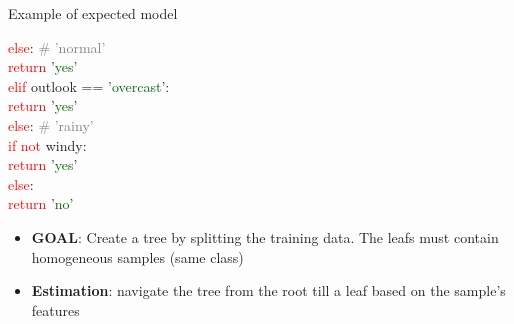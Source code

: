 \documentclass[xcolor=table]{beamer}
\begin{document}
\begin{frame}
\begin{exampleblock}{Example of expected model}
\begin{minipage}{0.25\textwidth}
			\hspace*{10pt}\textcolor{red}{else}: \textcolor{gray}{\# 'normal'}\\
			\hspace*{20pt}\textcolor{red}{return} '\textcolor{darkgreen}{yes}'\\
			\textcolor{red}{elif}  outlook == '\textcolor{darkgreen}{overcast}':\\
			\hspace*{10pt}\textcolor{red}{return} '\textcolor{darkgreen}{yes}'\\
			\textcolor{red}{else}: \textcolor{gray}{\# 'rainy'}\\
			\hspace*{10pt}\textcolor{red}{if not} windy:\\
			\hspace*{20pt}\textcolor{red}{return} '\textcolor{darkgreen}{yes}'\\
			\hspace*{10pt}\textcolor{red}{else}:\\
			\hspace*{20pt}\textcolor{red}{return} '\textcolor{darkgreen}{no}' 
		\end{minipage}
		\begin{minipage}{0.38\textwidth} 
		\end{minipage}
		\end{exampleblock}
		
		\vspace{-6pt}
		\begin{itemize}
			\item \textbf{GOAL}: Create a tree by splitting the training data. The leafs must contain homogeneous samples (same class)
			\item \textbf{Estimation}: navigate the tree from the root till a leaf based on the sample's features
		\end{itemize}
		
	\end{frame}
\end{document}
